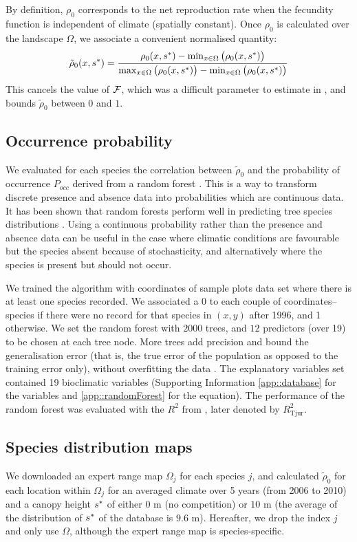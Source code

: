 By definition, $ \rho_0 $ corresponds to the net reproduction rate when the fecundity function is independent of climate (\ie spatially constant). Once $ \rho_0 $ is calculated over the landscape $ \Omega $, we associate a convenient normalised quantity:
\begin{equation} \label{eq::rho0_scaled}
	\tilde \rho_0(x, {s}^{*}) = \frac{\rho_0(x, {s}^{*}) - \min_{x \in \Omega} \big(\rho_0(x, {s}^{*}) \big)}{\max_{x \in \Omega} \big(\rho_0(x, {s}^{*}) \big) - \min_{x \in \Omega} \big(\rho_0(x, {s}^{*}) \big)}
\end{equation}
This cancels the value of $ \mathcal{F} $, which was a difficult parameter to estimate in \citet{Purves2008}, and bounds $ \tilde \rho_0 $ between $ 0 $ and $ 1 $.

\subsection{Occurrence probability}
We evaluated for each species the correlation between $ \tilde \rho_0 $ and the probability of occurrence $ P_{occ} $ derived from a random forest \citep[R package]{randomForest}. This is a way to transform discrete presence and absence data into probabilities which are continuous data. It has been shown that random forests perform well in predicting tree species distributions \citep{Prasad2006}. Using a continuous probability rather than the presence and absence data can be useful in the case where climatic conditions are favourable but the species absent because of stochasticity, and alternatively where the species is present but should not occur.

We trained the algorithm with coordinates of sample plots data set where there is at least one species recorded. We associated a 0 to each couple of coordinates--species if there were no record for that species in $ (x, y) $ after 1996, and 1 otherwise. We set the random forest with $ 2000 $ trees, and $ 12 $ predictors (over 19) to be chosen at each tree node. More trees add precision and bound the generalisation error (that is, the true error of the population as opposed to the training error only), without overfitting the data \citep{Prasad2006}. The explanatory variables set contained 19 bioclimatic variables (Supporting Information \ref{app::database} for the variables and \ref{app::randomForest} for the equation). The performance of the random forest was evaluated with the $ R^2 $ from \citet{Tjur2009}, later denoted by $ R_{\text{Tjur}}^2 $.

\subsection{Species distribution maps}
We downloaded an expert range map $ \Omega_j $ \citep{Prasad2003, Little1971} for each species $ j $, and calculated $ \tilde \rho_0 $ for each location within $ \Omega_j $ for an averaged climate over 5 years (from 2006 to 2010) and a canopy height $ {s}^{*} $ of either $ 0 $ m (no competition) or $ 10 $ m (the average of the distribution of $ {s}^{*} $ of the database is $ 9.6 $ m). Hereafter, we drop the index $ j $ and only use $ \Omega $, although the expert range map is species-specific.


